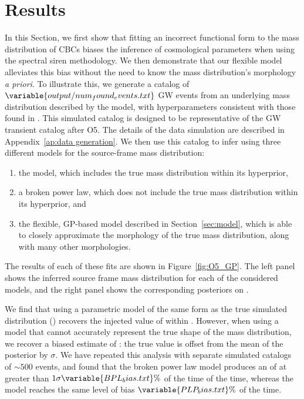 \documentclass[]{aastex631}
\begin{document}
\section{Results}
\label{sec:results}
In this Section, we first show that fitting an incorrect functional form to the mass distribution of \acp{CBC} biases the inference of cosmological parameters when using the spectral siren methodology.
We then demonstrate that our flexible model alleviates this bias without the need to know the mass distribution's morphology \emph{a priori}.
To illustrate this, we generate a catalog of $\variable{output/num_found_events.txt}$ \ac{GW} events from an underlying mass distribution described by the \plp{} model, with hyperparameters consistent with those found in \citet{o3b_pop}.
This simulated catalog is designed to be representative of the \ac{GW}  transient catalog after \ac{O5}.
The details of the data simulation are described in Appendix~\ref{ap:data generation}.
We then use this catalog to infer \Ho{} using three different models for the source-frame mass distribution:
\begin{enumerate}
    \item the \plp{} model, which includes the true mass distribution within its hyperprior,
    \item a broken power law, which does not include the true mass distribution within its hyperprior, and 
    \item the flexible, \ac{GP}-based model described in Section~\ref{sec:model}, which is able to closely approximate the morphology of the true mass distribution, along with many other morphologies.
\end{enumerate}
The results of each of these fits are shown in Figure~\ref{fig:O5_GP}. 
The left panel shows the inferred source frame mass distribution for each of the considered models, and the right panel shows the corresponding posteriors on \Ho{}.

We find that using a parametric model of the same form as the true simulated distribution (\plp) recovers the injected value of \Ho{} within .
However, when using a model that cannot accurately represent the true shape of the mass distribution, we recover a biased estimate of \Ho: the true value is offset from the mean of the posterior by $\sigma$.
We have repeated this analysis with  separate simulated catalogs of $\sim500$ events, and found that the broken power law model produces an  of \Ho{} at greater than $1\sigma \variable{BPL_bias.txt}\%$ of the time of the time, whereas %
the \plp{} model reaches the same level of bias $\variable{PLP_bias.txt}\%$ of the time.
\end{document}
